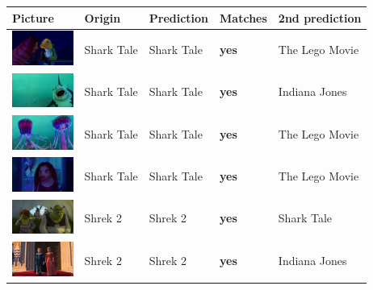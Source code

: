 \documentclass[conference]{IEEEtran}
\begin{document}
\newpage	
\vspace{5pt} 
\begin{table}[ht]
  \begin{tabular}{||P{2cm}|P{1.0cm}|P{1.2cm}|P{1.0cm}|P{1.2cm}||}

  \hline Picture & Origin & Prediction & Matches & 2nd prediction\\
\hline\vspace{0.1cm}
  \includegraphics[width=2cm]{sharktale_0.png} & Shark Tale & Shark Tale & \textbf{yes} & The Lego Movie\\
  
  \hline\vspace{0.1cm}
  \includegraphics[width=2cm]{sharktale_1.png} & Shark Tale & Shark Tale & \textbf{yes} & Indiana Jones\\
  
  \hline\vspace{0.1cm}
  \includegraphics[width=2cm]{sharktale_2.png} & Shark Tale & Shark Tale & \textbf{yes} & The Lego Movie\\
  
  \hline\vspace{0.1cm}
  \includegraphics[width=2cm]{sharktale_3.png} & Shark Tale & Shark Tale & \textbf{yes} & The Lego Movie\\
  
  

  
  \hline\vspace{0.1cm}
  \includegraphics[width=2cm]{shrek2_0.jpg} & Shrek 2 & Shrek 2 & \textbf{yes} & Shark Tale\\
  
  \hline\vspace{0.1cm}
  \includegraphics[width=2cm]{shrek2_1.jpg} & Shrek 2 & Shrek 2 & \textbf{yes} & Indiana Jones\\
  

\end{tabular}
\end{table}
\end{document}
